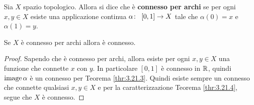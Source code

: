 \begin{definition}
	Sia $X$ spazio topologico. Allora si dice che è \textbf{connesso per archi} se per ogni $x, y \in X$ esiste una applicazione continua $\alpha \colon\ \left[0,1\right] \rightarrow X$ tale che $\alpha(0)=x$ e $\alpha(1)=y$.
\end{definition} 

\begin{theorem}
	Se $X$ è connesso per archi allora è connesso.
\end{theorem}
\begin{proof}
	Sapendo che è connesso per archi, allora esiste per ogni $x,y \in X$ una funzione che connette $x$ con $y$. In particolare $\left[0,1\right]$ è connesso in $\mathbb{R}$, quindi $\operatorname{image}{\alpha}$ è un connesso per Teorema \ref{thr:3.21.3}. Quindi esiste sempre un connesso che connette qualsiasi $x,y \in X$ e per la caratterizzazione Teorema \ref{thr:3.21.4}, segue che $X$ è connesso.
\end{proof}

